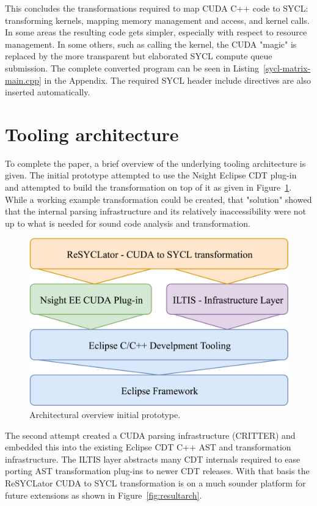 \documentclass[sigconf]{acmart}
\newcommand{\nsight}{Nsight\texttrademark{}}
\begin{document}
This concludes the transformations required to map CUDA C++ code to SYCL: transforming kernels, mapping memory management and access, and kernel calls. In some areas the resulting code gets simpler, especially with respect to resource management. In some others, such as calling the kernel, the CUDA "magic" is replaced by the more transparent but elaborated SYCL compute queue submission. The complete converted program can be seen in Listing~\ref{sycl-matrix-main.cpp} in the Appendix. The required SYCL header include directives are also inserted automatically.

\section{Tooling architecture}
To complete the paper, a brief overview of the underlying tooling architecture is given. The initial prototype attempted to use the \nsight{} Eclipse CDT plug-in and attempted to build the transformation on top of it as given in Figure~\ref{fig:protoarch}. While a working example transformation could be created, that "solution" showed that the internal parsing infrastructure and its relatively inaccessibility were not up to what is needed for sound code analysis and transformation. 
\begin{figure}[h]
  \centering
  \includegraphics[width=\linewidth]{SimpleArchitectureNsight}
  \caption{Architectural overview initial prototype.}
  \label{fig:protoarch}
\end{figure}

The second attempt created a CUDA parsing infrastructure (CRITTER) and embedded this into the existing Eclipse CDT C++ AST and transformation infrastructure\cite{stauberCRITTER2019}. The ILTIS layer \cite{stauberIltis2018} abstracts many CDT internals required to ease porting AST transformation plug-ins to newer CDT releases. With that basis the ReSYCLator CUDA to SYCL transformation is on a much sounder platform for future extensions as shown in Figure~\ref{fig:resultarch}.
\end{document}
